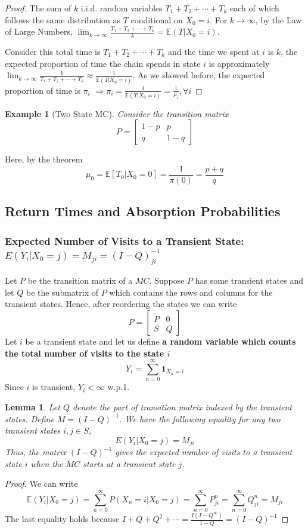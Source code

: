\documentclass[11pt,a4paper]{article}
\newtheorem{lemma}{Lemma}
\newtheorem{example}{Example}
\begin{document}
\begin{proof}
    The sum of $k$ i.i.d. random variables $T_1+T_2+\cdots+T_k$ each of which follows the same distribution as $T$ conditional on $X_0=i$. For $k \rightarrow \infty$, by the Law of Large Numbers, $\lim_{k \rightarrow \infty}\frac{T_1+T_2+\cdots+T_k}{k} = \mathbb{E}(T|X_0=i)$.

    Consider this total time is $T_1+T_2+\cdots+T_k$ and the time we spent at $i$ is $k$, the expected proportion of time the chain spends in state $i$ is approximately $\lim_{k \rightarrow \infty}\frac{k}{T_1+T_2+\cdots+T_k}\approx \frac{1}{\mathbb{E}(T|X_0=i)}$. As we showed before, the expected proportion of time is $\pi_i$ $\Rightarrow \pi_i=\frac{1}{\mathbb{E}(T|X_0=i)}=\frac{1}{\mu_i},\forall i$
\end{proof}

\begin{example}[Two State MC]
    Consider the transition matrix $$P=\begin{bmatrix}
        1-p&p\\
        q&1-q
    \end{bmatrix}$$
\end{example}
Here, by the theorem $$\mu_0=\mathbb{E}[T_0|X_0=0]=\frac{1}{\pi(0)}=\frac{p+q}{q}$$

\subsection{Return Times and Absorption Probabilities}
\subsubsection{Expected Number of Visits to a Transient State: $E(Y_i|X_0 = j) = M_{ji} = (I-Q)^{-1}_{ji}$}
Let $P$ be the transition matrix of a $MC$. Suppose $P$ has some transient states and let $Q$ be the submatrix of $P$ which contains the rows and columns for the transient states. Hence, after reordering the states we can write $$P=\begin{bmatrix}
    \tilde{P}&0\\
    S&Q
\end{bmatrix}$$
Let $i$ be a transient state and let us define \textbf{a random variable which counts the total number of visits to the state $i$}$$Y_i=\sum_{n=0}^\infty \mathbf{1}_{X_n=i}$$
Since $i$ is transient, $Y_i<\infty$ w.p.1.
\begin{lemma}
    Let $Q$ denote the part of transition matrix indexed by the transient states. Define $M = (I-Q)^{-1}$. We have the following equality for any two transient states $i,j\in S$,
    $$E(Y_i|X_0 = j) = M_{ji}$$ Thus, the matrix $(I-Q)^{-1}$ gives the expected number of visits to a transient state $i$ when the $MC$ starts at a transient state $j$.
\end{lemma}
\begin{proof}
    We can write $$\mathbb{E}(Y_i|X_0 = j)=\sum_{n=0}^\infty P(X_n=i|X_0=j)=\sum_{n=0}^\infty P^n_{ji}=\sum_{n=0}^\infty Q^n_{ji}=M_{ji}$$
    The last equality holds because $I+Q+Q^2+\cdots=\frac{I(I-Q^\infty)}{1-Q}=(I-Q)^{-1}$
\end{proof}
\end{document}
